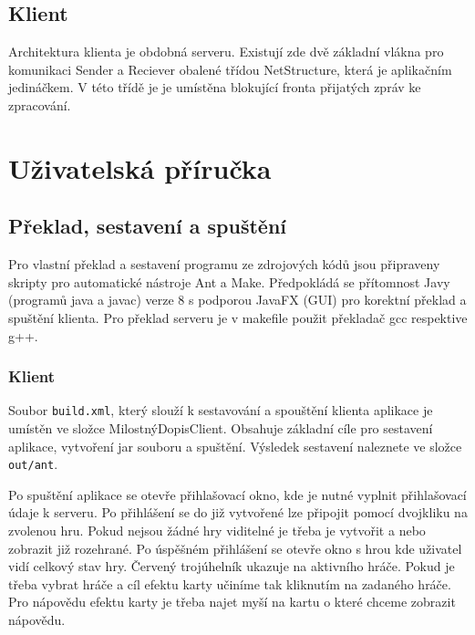 \documentclass[12pt, a4paper]{article}
\begin{document}
\subsection{Klient}

Architektura klienta je obdobná serveru. Existují zde dvě základní vlákna pro komunikaci Sender a Reciever obalené třídou NetStructure, která je aplikačním jedináčkem. V této třídě je je umístěna blokující fronta přijatých zpráv ke zpracování.

\section{Uživatelská příručka} %

\subsection{Překlad, sestavení a spuštění }

Pro vlastní překlad a sestavení programu ze zdrojových kódů jsou připraveny skripty pro automatické nástroje Ant a Make. Předpokládá se přítomnost Javy (programů java a javac) verze 8 s podporou JavaFX (GUI) pro korektní překlad a spuštění klienta. Pro překlad serveru je v makefile použit překladač gcc respektive g++.


\subsubsection{Klient}
Soubor \texttt{build.xml}, který slouží k sestavování a spouštění klienta aplikace je umístěn ve složce MilostnýDopisClient. Obsahuje základní cíle pro sestavení aplikace, vytvoření jar souboru a spuštění. Výsledek sestavení naleznete ve složce \texttt{out/ant}.

Po spuštění aplikace se otevře přihlašovací okno, kde je nutné vyplnit přihlašovací údaje k serveru. Po přihlášení se do již vytvořené lze připojit pomocí dvojkliku na zvolenou hru. Pokud nejsou žádné hry viditelné je třeba je vytvořit a nebo zobrazit již rozehrané.
Po úspěšném přihlášení se otevře okno s hrou kde uživatel vidí celkový stav hry. Červený trojúhelník ukazuje na aktivního hráče. Pokud je třeba vybrat hráče a cíl efektu karty učiníme tak kliknutím na zadaného hráče. Pro nápovědu efektu karty je třeba najet myší na kartu o které chceme zobrazit nápovědu.
\end{document}
